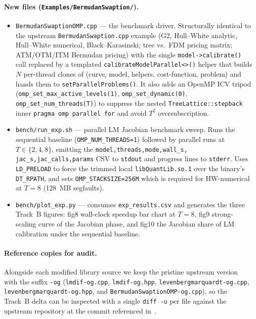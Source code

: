 \documentclass[11pt,twocolumn]{article}
\begin{document}
\paragraph{New files (\texttt{Examples/BermudanSwaption/}).}
\begin{itemize}[noitemsep]
  \item \texttt{BermudanSwaptionOMP.cpp} --- the benchmark driver.
    Structurally identical to the upstream
    \texttt{BermudanSwaption.cpp} example (G2, Hull--White analytic,
    Hull--White numerical, Black--Karasinski; tree vs.\ FDM pricing
    matrix; ATM/OTM/ITM Bermudan pricing) with the single
    \texttt{model->calibrate()} call replaced by a templated
    \texttt{calibrateModelParallel<>()} helper that builds
    $N$ per-thread clones of (curve, model, helpers, cost-function,
    problem) and hands them to \texttt{setParallelProblems()}. It
    also adds an OpenMP ICV tripod
    (\texttt{omp\_set\_max\_active\_levels(1)},
    \texttt{omp\_set\_dynamic(0)},
    \texttt{omp\_set\_num\_threads(T)}) to suppress the nested
    \texttt{TreeLattice::stepback} inner \texttt{pragma omp parallel
    for} and avoid $T^2$ oversubscription.
  \item \texttt{bench/run\_exp.sh} --- parallel LM Jacobian benchmark
    sweep. Runs the sequential baseline
    (\texttt{OMP\_NUM\_THREADS=1}) followed by parallel runs at
    $T\in\{2,4,8\}$, emitting the \texttt{model,threads,mode,wall\_s,
    jac\_s,jac\_calls,params} CSV to \texttt{stdout} and progress
    lines to \texttt{stderr}. Uses \texttt{LD\_PRELOAD} to force the
    trimmed local \texttt{libQuantLib.so.1} over the binary's
    \texttt{DT\_RPATH}, and sets \texttt{OMP\_STACKSIZE=256M} which
    is required for HW-numerical at $T{=}8$ (128~MB segfaults).
  \item \texttt{bench/plot\_exp.py} --- consumes
    \texttt{exp\_results.csv} and generates the three Track~B
    figures: fig8 wall-clock speedup bar chart at $T{=}8$, fig9
    strong-scaling curve of the Jacobian phase, and fig10 the
    Jacobian share of LM calibration under the sequential baseline.
\end{itemize}

\paragraph{Reference copies for audit.}
Alongside each modified library source we keep the pristine upstream
version with the suffix \texttt{-og} (\texttt{lmdif-og.cpp},
\texttt{lmdif-og.hpp}, \texttt{levenbergmarquardt-og.cpp},
\texttt{levenbergmarquardt-og.hpp}, and
\texttt{BermudanSwaptionOMP-og.cpp}), so the Track~B delta can be
inspected with a single \texttt{diff -u} per file against the
upstream repository at the commit referenced in~\cite{quantlib_repo}.



\end{document}
